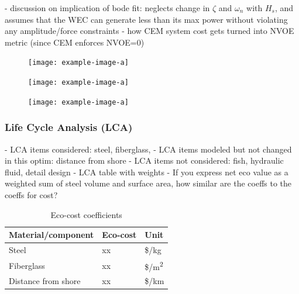 \documentclass[10pt,twoside]{article}
\begin{document}
    -  discussion on implication of bode fit: neglects change in $\zeta$ and $\omega_n$ with $H_s$, and assumes that the WEC can generate less than its max power without violating any amplitude/force constraints        
    -  how CEM system cost gets turned into NVOE metric (since CEM enforces NVOE=0)    

\begin{figure}[b]
\noindent
\begin{minipage}[t]{0.32\textwidth}
    \centering
    \texttt{[image: example-image-a]}
    \label{fig:CEM-data}
\end{minipage}
\hfill
\begin{minipage}[t]{0.32\textwidth}
    \centering
    \texttt{[image: example-image-a]}
    \label{fig:bode}
\end{minipage}
\hfill
\begin{minipage}[t]{0.32\textwidth}
    \centering
    \texttt{[image: example-image-a]}
    \label{fig:three}
\end{minipage}
\end{figure}

\subsubsection{Life Cycle Analysis (LCA)}
    -  LCA items considered: steel, fiberglass,
    -  LCA items modeled but not changed in this optim: distance from shore
    -  LCA items not considered: fish, hydraulic fluid, detail design
    -  LCA table with weights
    -  If you express net eco value as a weighted sum of steel volume and surface area, how similar are the coeffs to the coeffs for cost?

\begin{table}[H]
    \begin{center}
    \begin{tabular}{ lll } 
     \hline
     Material/component & Eco-cost & Unit \\ 
     \hline
     Steel & xx & \$/kg \\ 
     Fiberglass & xx & \$/m\textsuperscript{2} \\ 
     Distance from shore & xx & \$/km \\ 
    \end{tabular}
    \caption{Eco-cost coefficients}
    \label{tab:lca-weights}
    \end{center}
\end{table}
\end{document}
